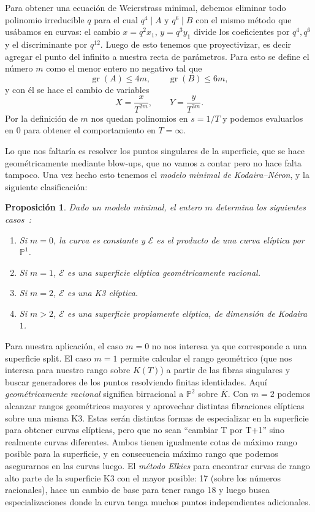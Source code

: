 \documentclass[a4paper]{book}
\theoremstyle{definition}
\theoremstyle{plain}
\newtheorem*{prop*}{Proposición}
\DeclareMathOperator{\gr}{gr}
\newcommand{\PP}{\mathbb{P}}
\newcommand{\ee}{\mathcal{E}}
\begin{document}
Para obtener una ecuación de Weierstrass minimal, debemos eliminar todo polinomio irreducible $q$ para el cual $q^4\mid A$ y $q^6\mid B$ con el mismo método que usábamos en curvas: el cambio $x=q^2x_1$, $y=q^3y_1$ divide los coeficientes por $q^4,q^6$ y el discriminante por $q^{12}$. Luego de esto tenemos que proyectivizar, es decir agregar el punto del infinito a nuestra recta de parámetros. Para esto se define el número $m$ como el menor entero no negativo tal que 
\[
\gr(A)\leq 4m,\qquad \gr(B)\leq 6m,
\]
y con él se hace el cambio de variables
\[
X=\frac{x}{T^{2m}},\qquad Y=\frac{y}{T^{3m}}.
\]
Por la definición de $m$ nos quedan polinomios en $s = 1/T$ y podemos evaluarlos en 0 para obtener el comportamiento en $T=\infty$. 

Lo que nos faltaría es resolver los puntos singulares de la superficie, que se hace geométricamente mediante blow-ups, que no vamos a contar pero no hace falta tampoco. Una vez hecho esto tenemos el \emph{modelo minimal de Kodaira--Néron}, y la siguiente clasificación:

\begin{prop*}
Dado un modelo minimal, el entero $m$ determina los siguientes casos~\cite{SchuttShioda2010}:
\begin{enumerate}
    \item Si $m=0$, la curva es constante y $\ee$ es el producto de una curva elíptica por $\PP^1$.
    \item Si $m=1$, $\ee$ es una superficie elíptica geométricamente racional.
    \item Si $m=2$, $\ee$ es una K3 elíptica.
    \item Si $m>2$, $\ee$ es una superficie propiamente elíptica, de dimensión de Kodaira $1$.
\end{enumerate}
\end{prop*}

Para nuestra aplicación, el caso $m=0$ no nos interesa ya que corresponde a una superficie split. El caso $m=1$ permite calcular el rango geométrico (que nos interesa para nuestro rango sobre $K(T)$) a partir de las fibras singulares y buscar generadores de los puntos resolviendo finitas identidades. Aquí \emph{geométricamente racional} significa birracional a $\PP^2$ sobre $\bar K$. Con $m=2$ podemos alcanzar rangos geométricos mayores y aprovechar distintas fibraciones elípticas sobre una misma K3. Estas serán distintas formas de especializar en la superficie para obtener curvas elípticas, pero que no sean ``cambiar T por T+1'' sino realmente curvas diferentes. Ambos tienen igualmente cotas de máximo rango posible para la superficie, y en consecuencia máximo rango que podemos asegurarnos en las curvas luego. El \emph{método Elkies} para encontrar curvas de rango alto parte de la superficie K3 con el mayor posible: 17 (sobre los números racionales), hace un cambio de base para tener rango 18 y luego busca especializaciones donde la curva tenga muchos puntos independientes adicionales.
\end{document}
